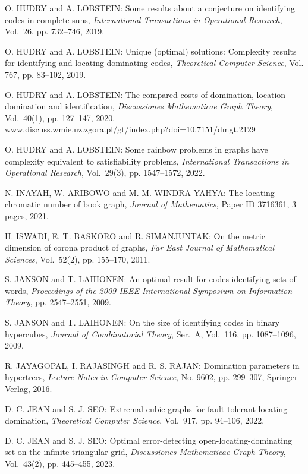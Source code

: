 \begin{thebibliography}{999}
O. HUDRY and A. LOBSTEIN: Some results about a conjecture on identifying codes in complete suns, {\it International Transactions in Operational Research}, Vol.~26, pp. 732--746, 2019.

O. HUDRY and A. LOBSTEIN: Unique (optimal) solutions: Complexity results for identifying and locating-dominating codes, {\it Theoretical Computer Science}, Vol. 767, pp. 83--102, 2019.

O. HUDRY and A. LOBSTEIN: The compared costs of domination, location-domination and identification, {\it Discussiones Mathematicae Graph Theory}, Vol.~40(1), pp. 127--147, 2020.\\
www.discuss.wmie.uz.zgora.pl/gt/index.php?doi=10.7151/dmgt.2129

O. HUDRY and A. LOBSTEIN: Some rainbow problems in graphs have complexity equivalent to satisfiability problems, {\it International Transactions in Operational Research}, Vol.~29(3), pp. 1547--1572, 2022.
  
N. INAYAH, W. ARIBOWO and M. M. WINDRA YAHYA: The locating chromatic number of book graph, {\it Journal of Mathematics}, Paper ID 3716361, 3 pages, 2021.

H. ISWADI, E. T. BASKORO and R. SIMANJUNTAK: On the metric dimension of corona product of graphs, {\it Far East Journal of Mathematical Sciences}, Vol.~52(2), pp. 155--170, 2011.   

S. JANSON and T. LAIHONEN: An optimal result for codes identifying sets of words, {\it Proceedings of the 2009 IEEE International Symposium on Information Theory}, pp. 2547--2551, 2009.

S. JANSON and T. LAIHONEN: On the size of identifying codes in binary hypercubes, {\it Journal of Combinatorial Theory}, Ser.~A, Vol.~116, pp. 1087--1096, 2009.

R. JAYAGOPAL, I. RAJASINGH and R. S. RAJAN: Domination parameters in hypertrees, {\it Lecture Notes in Computer Science}, No. 9602, pp. 299--307, Springer-Verlag, 2016.

D. C. JEAN and S. J. SEO: Extremal cubic graphs for fault-tolerant locating domination, {\it Theoretical Computer Science}, Vol.~917, pp. 94--106, 2022.

D. C. JEAN and S. J. SEO: Optimal error-detecting open-locating-dominating set on the infinite triangular grid, {\it Discussiones Mathematicae Graph Theory}, Vol.~43(2), pp. 445--455, 2023. 


\end{thebibliography}
